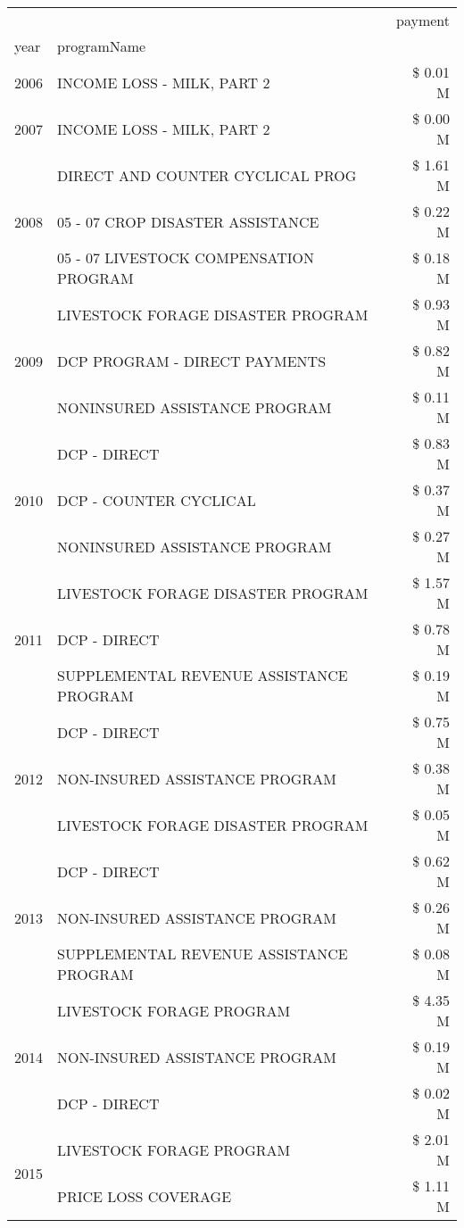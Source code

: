 \begin{tabular}{llr}
\toprule
 &  & payment \\
year & programName &  \\
\midrule
2006 & INCOME LOSS - MILK, PART 2 & \$ 0.01 M \\
\cline{1-3}
2007 & INCOME LOSS - MILK, PART 2 & \$ 0.00 M \\
\cline{1-3}
\multirow[t]{3}{*}{2008} & DIRECT AND COUNTER CYCLICAL PROG & \$ 1.61 M \\
 & 05 - 07 CROP DISASTER ASSISTANCE & \$ 0.22 M \\
 & 05 - 07 LIVESTOCK COMPENSATION PROGRAM & \$ 0.18 M \\
\cline{1-3}
\multirow[t]{3}{*}{2009} & LIVESTOCK FORAGE DISASTER  PROGRAM & \$ 0.93 M \\
 & DCP PROGRAM - DIRECT PAYMENTS & \$ 0.82 M \\
 & NONINSURED ASSISTANCE PROGRAM & \$ 0.11 M \\
\cline{1-3}
\multirow[t]{3}{*}{2010} & DCP - DIRECT & \$ 0.83 M \\
 & DCP - COUNTER CYCLICAL & \$ 0.37 M \\
 & NONINSURED ASSISTANCE PROGRAM & \$ 0.27 M \\
\cline{1-3}
\multirow[t]{3}{*}{2011} & LIVESTOCK FORAGE DISASTER PROGRAM & \$ 1.57 M \\
 & DCP - DIRECT & \$ 0.78 M \\
 & SUPPLEMENTAL REVENUE ASSISTANCE PROGRAM & \$ 0.19 M \\
\cline{1-3}
\multirow[t]{3}{*}{2012} & DCP - DIRECT & \$ 0.75 M \\
 & NON-INSURED ASSISTANCE PROGRAM & \$ 0.38 M \\
 & LIVESTOCK FORAGE DISASTER PROGRAM & \$ 0.05 M \\
\cline{1-3}
\multirow[t]{3}{*}{2013} & DCP - DIRECT & \$ 0.62 M \\
 & NON-INSURED ASSISTANCE PROGRAM & \$ 0.26 M \\
 & SUPPLEMENTAL REVENUE ASSISTANCE PROGRAM & \$ 0.08 M \\
\cline{1-3}
\multirow[t]{3}{*}{2014} & LIVESTOCK FORAGE PROGRAM & \$ 4.35 M \\
 & NON-INSURED ASSISTANCE PROGRAM & \$ 0.19 M \\
 & DCP - DIRECT & \$ 0.02 M \\
\cline{1-3}
\multirow[t]{3}{*}{2015} & LIVESTOCK FORAGE PROGRAM & \$ 2.01 M \\
 & PRICE LOSS COVERAGE & \$ 1.11 M \\

\end{tabular}
